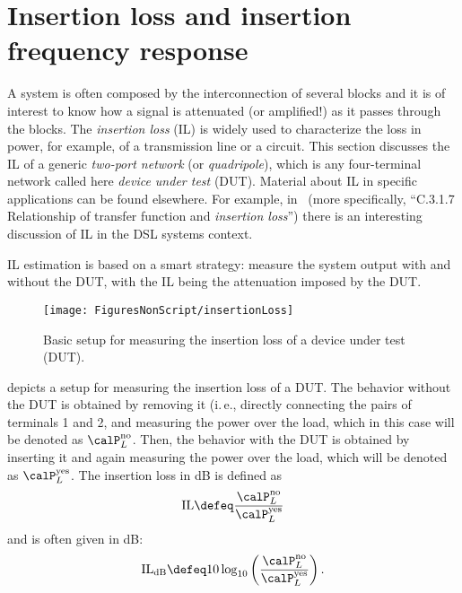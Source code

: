 \section{Insertion loss and insertion frequency response}
\label{sec:insertionLoss}

A system is often composed by the interconnection of several blocks and it is of interest to
know how a signal is attenuated (or amplified!) as it passes through the blocks.
The \emph{insertion loss} (IL) is widely used to characterize the loss in power, for example,
of a transmission line or a circuit. This section discusses the IL of a generic \emph{two-port network} (or \emph{quadripole}), which is any four-terminal network called
here \emph{device under test} (DUT).
Material about IL in specific applications can be found elsewhere. 
For example, in~\cite{T1417} 
(more specifically, ``C.3.1.7 Relationship of transfer function and \emph{insertion loss}'')
there is an interesting discussion of IL in the DSL systems context.

IL estimation is based on a smart strategy: measure the system output 
with and without the DUT, with the IL being the attenuation 
imposed by the DUT.

\begin{figure}
\centering
\texttt{[image: FiguresNonScript/insertionLoss]}
\caption{Basic setup for measuring the insertion loss of a device under test (DUT).\label{fig:insertionLoss}}
\end{figure}

 depicts a setup for measuring the insertion loss of a DUT.
The behavior without the DUT is obtained by removing it (i.\,e.,
directly connecting the pairs of terminals 1 and 2, and measuring the 
power over the load, which in this case will be denoted as $\calP_L^{\textrm{no}}$.
Then, the behavior with the DUT is obtained by inserting it 
and again measuring the power over the load, which will be denoted as $\calP_L^{\textrm{yes}}$.
The insertion loss in dB is defined as
\begin{equation}
\textrm{IL} \defeq \frac {\calP_L^{\textrm{no}}} {\calP_L^{\textrm{yes}}}
\label{eq:insertionLossPower}
\end{equation}
and is often given in dB:
\begin{equation}
\textrm{IL}_{\textrm{dB}} \defeq 10 \log_{10} \left( \frac {\calP_L^{\textrm{no}}} {\calP_L^{\textrm{yes}}} \right).
\label{eq:insertionLossPowerdB}
\end{equation}

